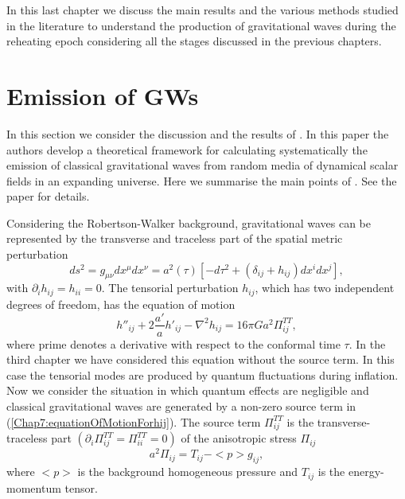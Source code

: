 \documentclass[11pt,a4paper,twoside]{book}
\begin{document}
 In this last chapter we discuss the main results and the various methods studied in the literature to understand the production of gravitational waves during the reheating epoch considering all the stages discussed in the previous chapters.

\section{Emission of GWs}
In this section we consider the discussion and the results of \cite{Chap7:GreenMethod}. In this paper the authors develop  a theoretical framework for calculating systematically the emission of classical gravitational waves from random media of dynamical scalar fields in an expanding universe. Here we summarise the main points of \cite{Chap7:GreenMethod}. See the paper for details. 

Considering the Robertson-Walker background, gravitational waves can be represented by the transverse and traceless part of the spatial metric perturbation
\begin{equation}
\label{Chap7:metricPerturbation}
ds^{2}=g_{\mu\nu}dx^{\mu}dx^{\nu} = a^{2}(\tau)[-d\tau^{2} + (\delta_{ij} + h_{ij})dx^{i}dx^{j}],
\end{equation}
with $ \partial_{i}h_{ij}=h_{ii}=0 $. The tensorial perturbation $ h_{ij} $, which has two independent degrees of freedom, has the equation of motion
\begin{equation}
\label{Chap7:equationOfMotionForhij}
h''_{ij} + 2\frac{a'}{a}h'_{ij} - \nabla^{2}h_{ij} = 16\pi G a^{2} \Pi^{TT}_{ij},
\end{equation}
where  prime denotes a derivative with respect to the conformal time $\tau$. In the third chapter we have considered this equation without the source term. In this case the tensorial modes are produced by quantum fluctuations during inflation. Now we consider the situation in which quantum effects are negligible and classical gravitational waves are generated by a non-zero source term in (\ref{Chap7:equationOfMotionForhij}). The source term $\Pi^{TT}_{ij}$ is the transverse-traceless part $ (\partial_{i}\Pi^{TT}_{ij} = \Pi^{TT}_{ii} = 0) $ of the anisotropic stress $ \Pi_{ij} $
\begin{equation}
\label{Chap7:anisotropicStress}
a^{2}\Pi_{ij}=T_{ij}-<p>g_{ij},
\end{equation}
where $ <p> $ is the background homogeneous pressure and $ T_{ij} $ is the energy-momentum tensor. 
\end{document}
